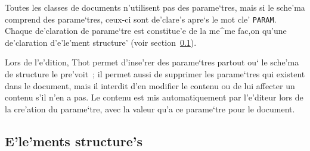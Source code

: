 Toutes les classes de documents n'utilisent pas des parame`tres, mais
si le sche'ma comprend des parame`tres, ceux-ci sont de'clare's apre`s le
mot cle' {\tt PARAM}.
Chaque de'claration de parame`tre est constitue'e de la me^me fac,on qu'une
de'claration d'e'le'ment structure' (voir section~\ref{elemstruct}).

Lors de l'e'dition, Thot permet d'inse'rer des parame`tres partout ou` le sche'ma
de structure le pre'voit~; il permet aussi de supprimer les parame`tres
qui existent dans le document, mais il interdit d'en modifier le contenu
ou de lui affecter un contenu s'il n'en a pas. Le contenu est mis
automatiquement par l'e'diteur lors de la cre'ation du parame`tre, avec la
valeur qu'a ce parame`tre pour le document.

\subsection{E'le'ments structure's}
\label{elemstruct}

